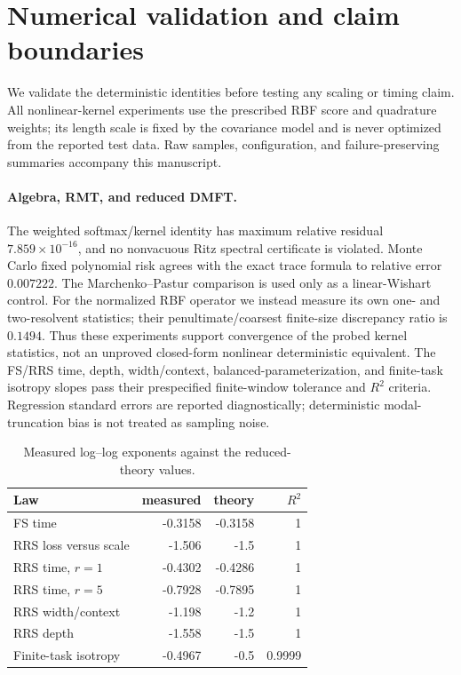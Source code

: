 \section{Numerical validation and claim boundaries}
\label{sec:numerical-validation}

We validate the deterministic identities before testing any scaling or timing
claim.  All nonlinear-kernel experiments use the prescribed RBF score and
quadrature weights; its length scale is fixed by the covariance model and is
never optimized from the reported test data.  Raw samples, configuration, and
failure-preserving summaries accompany this manuscript.

\paragraph{Algebra, RMT, and reduced DMFT.}
The weighted softmax/kernel identity has maximum relative residual
$7.859\times 10^{-16}$,
and no nonvacuous Ritz spectral certificate is violated.  Monte Carlo fixed
polynomial risk agrees with the exact trace formula to relative error
$0.007222$.  The
Marchenko--Pastur comparison is used only as a linear-Wishart control.  For the
normalized RBF operator we instead measure its own one- and two-resolvent
statistics; their penultimate/coarsest finite-size discrepancy ratio is
$0.1494$.
Thus these experiments support convergence of the probed kernel statistics,
not an unproved closed-form nonlinear deterministic equivalent.  The FS/RRS
time, depth, width/context, balanced-parameterization, and finite-task
isotropy slopes pass their prespecified finite-window tolerance and $R^2$
criteria.  Regression standard errors are reported diagnostically; deterministic
modal-truncation bias is not treated as sampling noise.

\begin{table}[H]
\centering
\caption{Measured log--log exponents against the reduced-theory values.}
\label{tab:scaling-exponents}
\begin{tabular}{lrrr}
\toprule
Law & measured & theory & $R^2$\\
\midrule
FS time & -0.3158
 & -0.3158
 & 1\\
RRS loss versus scale & -1.506
 & -1.5
 & 1\\
RRS time, $r=1$ & -0.4302
 & -0.4286
 & 1\\
RRS time, $r=5$ & -0.7928
 & -0.7895
 & 1\\
RRS width/context & -1.198
 & -1.2
 & 1\\
RRS depth & -1.558
 & -1.5
 & 1\\
Finite-task isotropy & -0.4967
 & -0.5
 & 0.9999\\
\bottomrule
\end{tabular}
\end{table}

